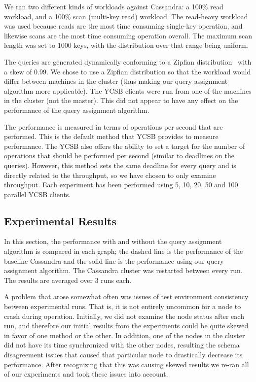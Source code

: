 We ran two different kinds of workloads against Cassandra: a 100\% read workload, and a 100\% scan (multi-key read) workload. The read-heavy workload was used because reads are the most time consuming single-key operation, and likewise scans are the most time consuming operation overall. The maximum scan length was set to 1000 keys, with the distribution over that range being uniform.

The queries are generated dynamically conforming to a Zipfian distribution~\cite{Gray:1994:QGB:191843.191886} with a skew of 0.99. We chose to use a Zipfian distribution so that the workload would differ between machines in the cluster (thus making our query assignment algorithm more applicable). The YCSB clients were run from one of the machines in the cluster (not the master). This did not appear to have any effect on the performance of the query assignment algorithm. 

The performance is measured in terms of operations per second that are performed. This is the default method that YCSB provides to measure performance. The YCSB also offers the ability to set a target for the number of operations that should be performed per second (similar to deadlines on the queries). However, this method sets the same deadline for every query and is directly related to the throughput, so we have chosen to only examine throughput. Each experiment has been performed using 5, 10, 20, 50 and 100 parallel YCSB clients.

\subsection{Experimental Results}
In this section, the performance with and without the query assignment algorithm is compared in each graph; the dashed line is the performance of the baseline Cassandra and the solid line is the performance using our query assignment algorithm. The Cassandra cluster was restarted between every run. The results are averaged over 3 runs each.

A problem that arose somewhat often was issues of test environment consistency between experimental runs. That is, it is not entirely uncommon for a node to crash during operation. Initially, we did not examine the node status after each run, and therefore our initial results from the experiments could be quite skewed in favor of one method or the other. In addition, one of the nodes in the cluster did not have its time synchronized with the other nodes, resulting the schema disagreement issues that caused that particular node to drastically decrease its performance. After recognizing that this was causing skewed results we re-ran all of our experiments and took these issues into account.

